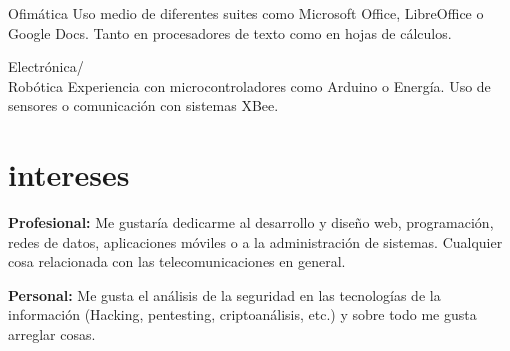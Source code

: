 \documentclass[hidelinks]{friggeri-cv} %
\begin{document}
\begin{entrylist}
\entry
{Ofimática}
{}
{}
{Uso medio de diferentes suites como Microsoft Office, LibreOffice o Google Docs.
Tanto en procesadores de texto como en hojas de cálculos.}

\entry
{Electrónica/ \\ Robótica}
{}
{}
{Experiencia con microcontroladores como Arduino o Energía. Uso de sensores o comunicación
con sistemas XBee.}
\end{entrylist}



\section{intereses}

\textbf{Profesional:} Me gustaría dedicarme al desarrollo y diseño web, programación, redes de datos, aplicaciones
móviles o a la administración de sistemas. Cualquier cosa relacionada con las telecomunicaciones
en general.

\textbf{Personal:} Me gusta el análisis de la seguridad en las tecnologías de la información
(Hacking, pentesting, criptoanálisis, etc.) y sobre todo me gusta arreglar cosas.



\end{document}
